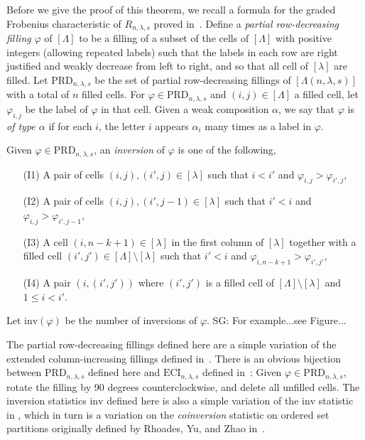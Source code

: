 \documentclass[12pt]{amsart}
\newcommand{\la}{\lambda}
\newcommand{\inv}{\mathrm{inv}}
\newcommand{\SG}[1]{{\color{red} SG: #1}}
\begin{document}
Before we give the proof of this theorem, we recall a formula for the graded Frobenius characteristic of $R_{n,\la,s}$ proved in~\cite{GriffinOSP}. Define a \emph{partial row-decreasing filling} $\varphi$ of $[\Lambda]$ to be a filling of a subset of the cells of $[\Lambda]$ with positive integers (allowing repeated labels) such that the labels in each row are right justified and weakly decrease from left to right, and so that all cell of $[\la]$ are filled. Let $\mathrm{PRD}_{n,\la,s}$ be the set of partial row-decreasing fillings of $[\Lambda(n,\la,s)]$ with a total of $n$ filled cells. For $\varphi\in \mathrm{PRD}_{n,\la,s}$ and $(i,j)\in [\Lambda]$ a filled cell, let $\varphi_{i,j}$ be the label of $\varphi$ in that cell. Given a weak composition $\alpha$, we say that $\varphi$ is \emph{of type $\alpha$} if for each $i$, the letter $i$ appears $\alpha_i$ many times as a label in $\varphi$.

Given $\varphi\in \mathrm{PRD}_{n,\la,s}$, an \emph{inversion} of $\varphi$ is one of the following,
\begin{enumerate}
\item  [(I1)] A pair of cells $(i,j),(i',j)\in [\la]$ such that $i<i'$ and $\varphi_{i,j} > \varphi_{i',j}$,
\item  [(I2)] A pair of cells $(i,j),(i',j-1)\in [\la]$ such that $i'<i$ and $\varphi_{i,j} > \varphi_{i',j-1}$,
\item  [(I3)] A cell $(i,n-k+1)\in [\la]$ in the first column of $[\la]$ together with a filled cell $(i',j')\in [\Lambda]\setminus [\la]$ such that $i' < i$ and $\varphi_{i,n-k+1} > \varphi_{i',j'}$,
\item  [(I4)] A pair $(i,(i',j'))$ where $(i',j')$ is a filled cell of $[\Lambda]\setminus [\la]$ and $1\leq i<i'$.
\end{enumerate}
Let $\inv(\varphi)$ be the number of inversions of $\varphi$. \SG{For example...see Figure...}

\begin{remark}
The partial row-decreasing fillings defined here are a simple variation of the extended column-increasing fillings defined in~\cite{GriffinOSP}. There is an obvious bijection between $\mathrm{PRD}_{n,\la,s}$ defined here and $\mathrm{ECI}_{n,\la,s}$ defined in~\cite{GriffinOSP}: Given $\varphi\in \mathrm{PRD}_{n,\la,s}$, rotate the filling by 90 degrees counterclockwise, and delete all unfilled cells. The inversion statistics $\mathrm{inv}$ defined here is also a simple variation of the $\mathrm{inv}$ statistic in \cite{GriffinOSP}, which in turn is a variation on the \emph{coinversion} statistic on ordered set partitions originally defined by Rhoades, Yu, and Zhao in~\cite{Rhoades-Yu-Zhao}.
\end{remark}
\end{document}

